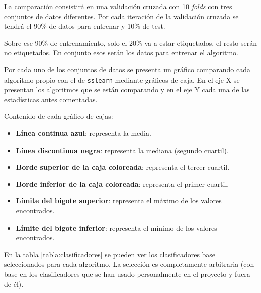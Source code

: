 La comparación consistirá en una validación cruzada con 10 \textit{folds} con
tres conjuntos de datos diferentes. Por cada iteración de la validación cruzada
se tendrá el 90\% de datos para entrenar y 10\% de test.

Sobre ese 90\% de entrenamiento, solo el 20\% va a estar etiquetados, el resto
serán no etiquetados. En conjunto esos serán los datos para entrenar el
algoritmo.

Por cada uno de los conjuntos de datos se presenta un gráfico comparando cada
algoritmo propio con el de \texttt{sslearn} mediante gráficos de caja. En el eje
X se presentan los algoritmos que se están comparando y en el eje Y cada una de
las estadísticas antes comentadas.

Contenido de cada gráfico de cajas:
\vspace{-0.4cm}
\begin{itemize}
    \item \textbf{Línea continua azul}: representa la media.
    \item \textbf{Línea discontinua negra}: representa la mediana (segundo
    cuartil).
    \item \textbf{Borde superior de la caja coloreada}: representa el tercer cuartil.
    \item \textbf{Borde inferior de la caja coloreada}: representa el primer cuartil.
    \item \textbf{Límite del bigote superior}: representa el máximo de los valores
    encontrados.
    \item \textbf{Límite del bigote inferior}: representa el mínimo de los valores
    encontrados.
\end{itemize}

En la tabla \ref{tabla:clasificadores} se pueden ver los clasificadores base
seleccionados para cada algoritmo. La selección es completamente arbitraria (con
base en los clasificadores que se han usado personalmente en el proyecto y fuera
de él).

\begin{table}[H]
    \centering
\caption{Clasificadores base}
\label{tabla:clasificadores}
\end{table}


